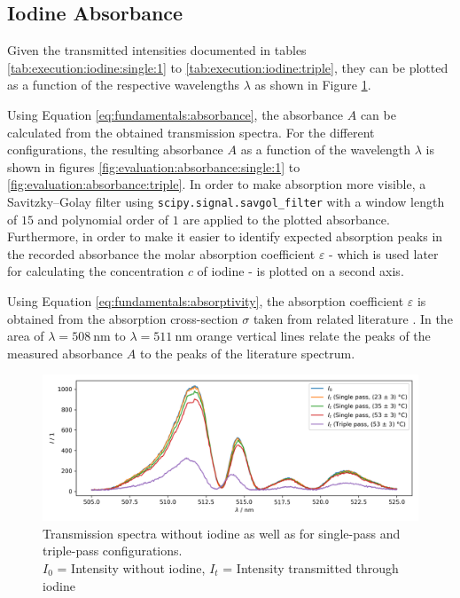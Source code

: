 \subsection{Iodine Absorbance}
\label{sec:evaluation:iodine-absorbance}

Given the transmitted intensities documented in tables \ref{tab:execution:iodine:single:1} to \ref{tab:execution:iodine:triple}, they can be plotted as a function of the respective wavelengths $\lambda$ as shown in Figure \ref{fig:evaluation:transmission}.

Using Equation \ref{eq:fundamentals:absorbance}, the absorbance $A$ can be calculated from the obtained transmission spectra. For the different configurations, the resulting absorbance $A$ as a function of the wavelength $\lambda$ is shown in figures \ref{fig:evaluation:absorbance:single:1} to \ref{fig:evaluation:absorbance:triple}. In order to make absorption more visible, a Savitzky–Golay filter using \verb|scipy.signal.savgol_filter| with a window length of $15$ and polynomial order of $1$ are applied to the plotted absorbance. Furthermore, in order to make it easier to identify expected absorption peaks in the recorded absorbance the molar absorption coefficient $\varepsilon$ - which is used later for calculating the concentration $c$ of iodine - is plotted on a second axis.

Using Equation \ref{eq:fundamentals:absorptivity}, the absorption coefficient $\varepsilon$ is obtained from the absorption cross-section $\sigma$ taken from related literature \cite{Iodine}. In the area of $\lambda = \SI{508}{\nm}$ to $\lambda = \SI{511}{\nm}$ orange vertical lines relate the peaks of the measured absorbance $A$ to the peaks of the literature spectrum.

\begin{figure}[H]
    \centering
    \includegraphics[width=\textwidth]{graphics/transmission.png}
    \caption{Transmission spectra without iodine as well as for single-pass and triple-pass configurations.\\
        $I_0$ = Intensity without iodine, $I_t$ = Intensity transmitted through iodine}
    \label{fig:evaluation:transmission}
\end{figure}

